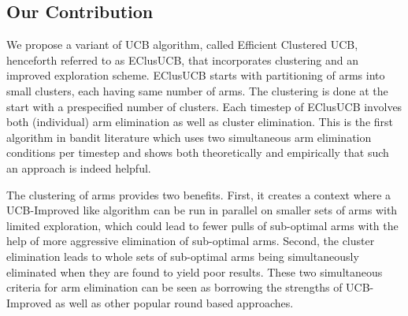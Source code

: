 \vspace*{-0.7em}
\subsection{Our Contribution}
We propose a variant of UCB algorithm, called Efficient Clustered UCB, henceforth referred to as EClusUCB, that incorporates clustering and an improved exploration scheme. EClusUCB starts with partitioning of arms into small clusters, each having same number of arms. The clustering is done at the start with a prespecified number of clusters. 
Each timestep of EClusUCB involves both (individual) arm elimination as well as cluster elimination. This is the first algorithm in bandit literature which uses two simultaneous arm elimination conditions per timestep and shows both theoretically and empirically that such an approach is indeed helpful.



The clustering of arms provides two benefits. First, it creates a context where a UCB-Improved like algorithm can be run in parallel on smaller sets of arms with limited exploration, which could lead to fewer pulls of sub-optimal arms with the help of  more aggressive elimination of sub-optimal arms. Second, the cluster elimination leads to whole sets of sub-optimal arms being simultaneously eliminated when they are found to yield poor results. These two simultaneous criteria for arm elimination can be seen as borrowing the strengths of UCB-Improved as well as other popular round based approaches. 

